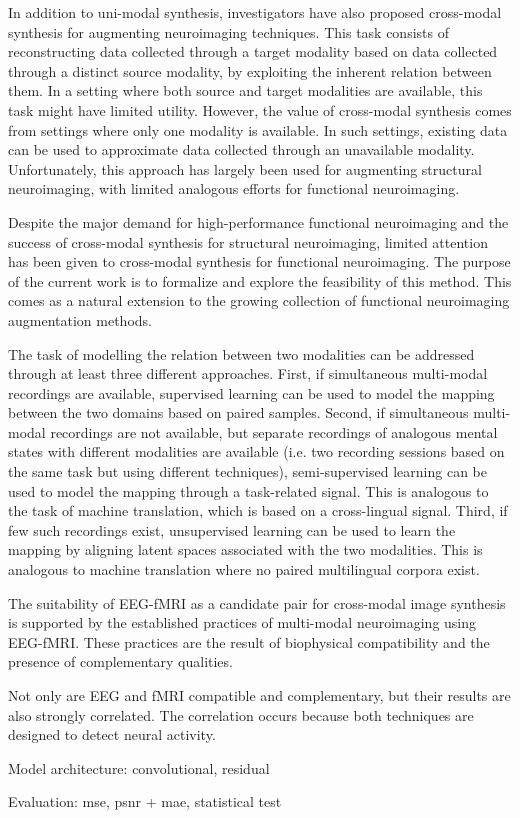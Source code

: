 \documentclass{article}
\begin{document}
In addition to uni-modal synthesis, investigators have also proposed cross-modal synthesis for augmenting neuroimaging techniques. This task consists of reconstructing data collected through a target modality based on data collected through a distinct source modality, by exploiting the inherent relation between them. In a setting where both source and target modalities are available, this task might have limited utility. However, the value of cross-modal synthesis comes from settings where only one modality is available. In such settings, existing data can be used to approximate data collected through an unavailable modality. Unfortunately, this approach has largely been used for augmenting structural neuroimaging, with limited analogous efforts for functional neuroimaging.

Despite the major demand for high-performance functional neuroimaging and the success of cross-modal synthesis for structural neuroimaging, limited attention has been given to cross-modal synthesis for functional neuroimaging. The purpose of the current work is to formalize and explore the feasibility of this method. This comes as a natural extension to the growing collection of functional neuroimaging augmentation methods.

The task of modelling the relation between two modalities can be addressed through at least three different approaches. First, if simultaneous multi-modal recordings are available, supervised learning can be used to model the mapping between the two domains based on paired samples. Second, if simultaneous multi-modal recordings are not available, but separate recordings of analogous mental states with different modalities are available (i.e. two recording sessions based on the same task but using different techniques), semi-supervised learning can be used to model the mapping through a task-related signal. This is analogous to the task of machine translation, which is based on a cross-lingual signal. Third, if few such recordings exist, unsupervised learning can be used to learn the mapping by aligning latent spaces associated with the two modalities. This is analogous to machine translation where no paired multilingual corpora exist.

The suitability of EEG-fMRI as a candidate pair for cross-modal image synthesis is supported by the established practices of multi-modal neuroimaging using EEG-fMRI. These practices are the result of biophysical compatibility and the presence of complementary qualities. 

Not only are EEG and fMRI compatible and complementary, but their results are also strongly correlated. The correlation occurs because both techniques are designed to detect neural activity.

Model architecture: convolutional, residual

Evaluation: mse, psnr + mae, statistical test
\end{document}

